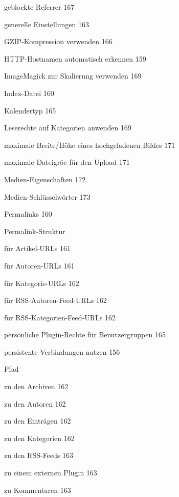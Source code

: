 \documentclass{book}
\renewcommand\subitem{\par}
\renewcommand\subsubitem{\par\hspace*{3mm}}
\begin{document}
\begin{multicols}{2}
\begin{osp-index}
    \subitem geblockte Referrer\hspace{1mm} 167
    \subitem generelle Einstellungen\hspace{1mm} 163
    \subitem GZIP-Kompression verwenden\hspace{1mm} 166
    \subitem HTTP-Hostnamen automatisch erkennen\hspace{1mm} 159
    \subitem ImageMagick zur Skalierung verwenden\hspace{1mm} 169
    \subitem Index-Datei\hspace{1mm} 160
    \subitem Kalendertyp\hspace{1mm} 165
    \subitem Leserechte auf Kategorien anwenden\hspace{1mm} 169
    \subitem maximale Breite/H\"ohe eines hochgeladenen Bildes\hspace{1mm} 
		171
    \subitem maximale Dateigr\"o\IeC {\ss }e f\"ur den Upload\hspace{1mm} 
		171
    \subitem Medien-Eigenschaften\hspace{1mm} 172
    \subitem Medien-Schl\"usselw\"orter\hspace{1mm} 173
    \subitem Permalinks\hspace{1mm} 160
    \subitem Permalink-Struktur
      \subsubitem f\"ur Artikel-URLs\hspace{1mm} 161
      \subsubitem f\"ur Autoren-URLs\hspace{1mm} 161
      \subsubitem f\"ur Kategorie-URLs\hspace{1mm} 162
      \subsubitem f\"ur RSS-Autoren-Feed-URLs\hspace{1mm} 162
      \subsubitem f\"ur RSS-Kategorien-Feed-URLs\hspace{1mm} 162
    \subitem pers\"onliche Plugin-Rechte f\"ur Benutzergruppen\hspace{1mm} 
		165
    \subitem persistente Verbindungen nutzen\hspace{1mm} 156
    \subitem Pfad
      \subsubitem zu den Archiven\hspace{1mm} 162
      \subsubitem zu den Autoren\hspace{1mm} 162
      \subsubitem zu den Eintr\"agen\hspace{1mm} 162
      \subsubitem zu den Kategorien\hspace{1mm} 162
      \subsubitem zu den RSS-Feeds\hspace{1mm} 163
      \subsubitem zu einem externen Plugin\hspace{1mm} 163
      \subsubitem zu Kommentaren\hspace{1mm} 163

\end{osp-index}
\end{multicols}
\end{document}
